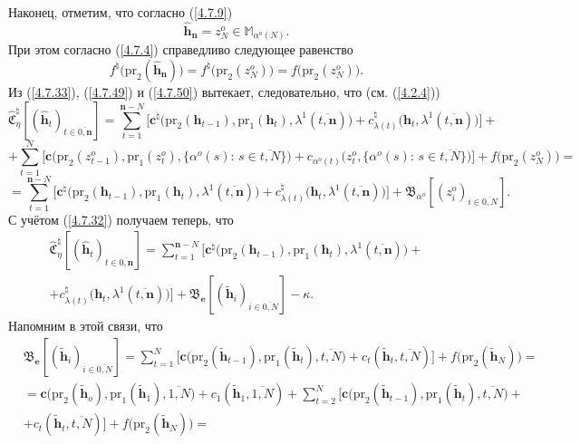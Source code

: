\documentclass[12pt,twoside]{report}
\newcommand{\bfn}{\begin{equation}}
\newcommand{\efn}{\end{equation}}
\newcommand{\ov}{\overline}
\newcommand{\la}{\lambda}
\newcommand{\al}{\alpha}
\newcommand{\zc}{{\mathbf c}}
\newcommand{\nn}{{\mathbf n}}
\begin{document}
{{Наконец, отметим, что согласно (\ref{4.7.9})
$$
\hat{\mathbf{h}}_\nn = z_N^o\in \mathbb{M}_{\al^o(N)}.
$$
При этом согласно (\ref{4.7.4}) справедливо следующее равенство
\bfn\label{4.7.50}f^\natural\bigl(\mathrm{pr}_2(\hat{\mathbf{h}}_\nn)\bigl) =
f^\natural\bigl(\mathrm{pr}_2(z_N^o)\bigl) = f\bigl(\mathrm{pr}_2(z_N^o)\bigl).
\efn
Из (\ref{4.7.33}), (\ref{4.7.49}) и (\ref{4.7.50}) вытекает, следовательно, что (см. (\ref{4.2.4}))
$$
\widehat{\mathfrak{C}}_\eta^\natural[(\hat{\mathbf{h}}_t)_{t\in\ov{0,\nn}}] =
\sum\limits_{t=1}^{\nn-N}\bigl[\zc^\natural\bigl(\mathrm{pr}_2(\mathbf{h}_{t-1}),\mathrm{pr}_1
(\mathbf{h}_t),\la^1(\ov{t,\nn})\bigl) + c_{\la(t)}^\natural\bigl(\mathbf{h}_t,
\la^1(\ov{t,\nn})\bigl)\bigl]+$$ $$+\sum\limits_{t=1}^N \bigl[\zc\bigl(\mathrm{pr}_2(z_{t-1}^o),
\mathrm{pr}_1(z_t^o),\{\al^o(s):\,s\in \ov{t,N}\}\bigl) + c_{\al^o(t)}\bigl(z_t^o,\{\al^o(s):\,
s\in \ov{t,N}\}\bigl)\bigl]+ f\bigl(\mathrm{pr}_2(z_N^o)\bigl) = $$ $$=\sum\limits_{t=1}^{\nn-N}
\bigl[\zc^\natural\bigl(\mathrm{pr}_2(\mathbf{h}_{t-1}),\mathrm{pr}_1
(\mathbf{h}_t),\la^1(\ov{t,\nn})\bigl)+ c_{\la(t)}^\natural\bigl(\mathbf{h}_t,\la^1(\ov{t,\nn})
\bigl)\bigl] + \mathfrak{B}_{\al^o}[(z_i^o)_{i\in\ov{0,N}}].
$$
С учётом (\ref{4.7.32}) получаем теперь, что
\begin{eqnarray}
&\widehat{\mathfrak{C}}_\eta^\natural[(\hat{\mathbf{h}}_t)_{t\in\ov{0,\nn}}] =
\sum\limits_{t=1}^{\nn-N}\bigl[\zc^\natural\bigl(\mathrm{pr}_2(\mathbf{h}_{t-1}),\mathrm{pr}_1
(\mathbf{h}_t),\la^1(\ov{t,\nn})\bigl) +
&\nonumber\\
&+ c_{\la(t)}^\natural\bigl(\mathbf{h}_t,\la^1(\ov{t,\nn})\bigl)\bigl]+
\mathfrak{B}_\mathbf{e}[(\tilde{\mathbf{h}}_i)_{i\in\ov{0,N}}]-\kappa.
&\label{4.7.51}
\end{eqnarray}
 Напомним в этой связи, что
\begin{eqnarray}
&\mathfrak{B}_\mathbf{e}[(\tilde{\mathbf{h}}_i)_{i\in\ov{0,N}}] =
\sum\limits_{t=1}^N\bigl[\zc\bigl(\mathrm{pr}_2(\tilde{\mathbf{h}}_{t-1}),\mathrm{pr}_1
(\tilde{\mathbf{h}}_t),\ov{t,N}) + c_t(\tilde{\mathbf{h}}_t,\ov{t,N})\bigl]+
f\bigl(\mathrm{pr}_2(\tilde{\mathbf{h}}_N)\bigl) =
&\nonumber\\
&=\zc\bigl(\mathrm{pr}_2(\tilde{\mathbf{h}}_o),\mathrm{pr}_1
(\tilde{\mathbf{h}}_1),\ov{1,N}) +c_1(\tilde{\mathbf{h}}_1,\ov{1,N}) +
\sum\limits_{t=2}^N\bigl[\zc\bigl(\mathrm{pr}_2(\tilde{\mathbf{h}}_{t-1}),\mathrm{pr}_1
(\tilde{\mathbf{h}}_t),\ov{t,N}\bigl) +
&\nonumber\\
&+ c_t(\tilde{\mathbf{h}}_t,\ov{t,N})\bigl] + f\bigl(\mathrm{pr}_2(\tilde{\mathbf{h}}_N)\bigl)=

\end{eqnarray}}}
\end{document}
